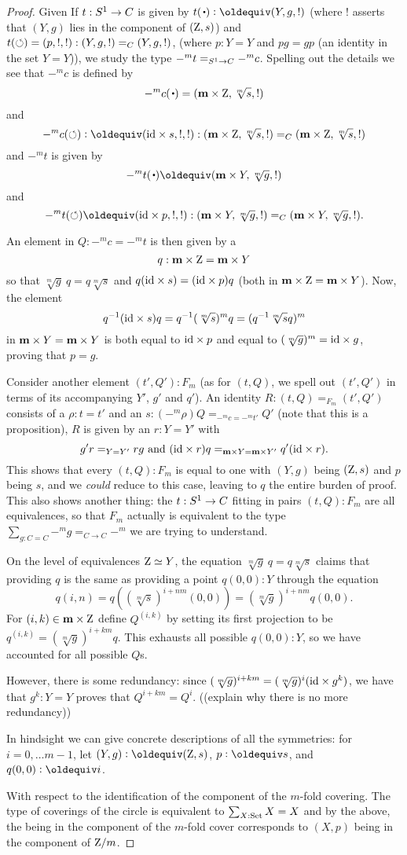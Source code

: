 \begin{proof}
Given If $t:{S^1}\to C$ is given by $t(\base)\defequi (Y,g,!)$ (where $!$ asserts that $(Y,g)$ lies in the component of $(\mathrm{Z},s)$)  and $t(\circlearrowleft)=(p,!,!):(Y,g,!)=_C(Y,g,!)$, (where $p:Y=Y$ and $pg=gp$ (an identity in the set $Y=Y$)), we study the type $-^mt=_{{S^1}\to C}-^mc$.
Spelling out the details we see that $-^mc$ is defined by 
$$-^mc(\base)=(\bn m\times\zet,\sqrt[m]s,!)$$ and 
$$-^mc(\Sloop)\defequi(\id\times s,!,!):(\bn m\times\zet,\sqrt[m]s,!)=_C(\bn m\times\zet,\sqrt[m]s,!)$$   and $-^mt$ is given by $$-^mt(\base)\oldequiv(\bn m\times Y,\sqrt[m]g,!)$$ and 
$$-^mt(\Sloop)\oldequiv(\id\times p,!,!):(\bn m\times Y,\sqrt[m]g,!)=_C(\bn m\times Y,\sqrt[m]g,!).$$

An element in $Q:-^mc=-^mt$ is then given by a 
$$q:\mathbf{m}\times\mathrm{Z}=\mathbf{m}\times Y$$ so that $\sqrt[m]g\ q=q\sqrt[m]s$ and $q(\mathord{\mathrm{id}}\times s)=(\mathord{\mathrm{id}}\times p)q$ (both in $\mathbf{m}\times\mathrm{Z}=\mathbf{m}\times Y$). 
Now, the element $$q^{-1}(\mathord{\mathrm{id}}\times s)q=q^{-1}(\sqrt[m]s)^mq=(q^{-1}\sqrt[m]sq)^m$$ in $\mathbf{m}\times Y=\mathbf{m}\times Y$ is both equal to $\mathord{\mathrm{id}}\times p$ and equal to $(\sqrt[m]g)^m=\mathord{\mathrm{id}}\times g$, proving that $p=g$. 


Consider another element $(t',Q'):F_m$ (as for $(t,Q)$, we spell out $(t',Q')$ in terms of its accompanying $Y'$, $g'$ and $q'$). 
An identity  $R:(t,Q)=_{F_m}(t',Q')$ consists of a $\rho:t=t'$ and an $s:(-^m\rho)Q=_{-^mc=-^mt'}Q'$ (note that this is a proposition), \ie $R$ is given by an $r:Y=Y'$ with 
$$g'r=_{Y=Y'}rg\text{ and }(\mathord{\mathrm{id}}\times r)q=_{\mathbf{m}\times Y=\mathbf{m}\times Y'}q'(\mathord{\mathrm{id}}\times r).$$  This shows that every $(t,Q):F_m$ is equal to one with $(Y,g)$ being $(\mathrm{Z},s)$ and $p$ being $s$, and we \emph{could} reduce to this case, leaving to $q$ the entire burden of proof.  
This also shows another thing: the $t:{S^1}\to C$ fitting in pairs $(t,Q):F_m$ are all equivalences, so that $F_m$ actually is equivalent to the type $\sum_{g:C=C}-^mg=_{C\to C}-^m$ we are trying to understand.

 On the level of equivalences $\mathrm{Z}\simeq Y$, the equation  $\sqrt[m]g\ q=q\sqrt[m]s$ claims that providing $q$ is the same as providing a point $q(0,0):Y$ through the equation  
$$q(i,n)=q((\sqrt[m]s)^{i+nm}(0,0))=(\sqrt[m]g)^{i+nm}q(0,0).$$  For $(i,k)\in \mathbf{m}\times\mathrm{Z}$ define $Q^{(i,k)}$ by setting its first projection to be $q^{(i,k)}=(\sqrt[m]g)^{i+km}q$.  
This exhausts all possible $q(0,0):Y$, so we have accounted for all possible $Q$s.

However, there is some redundancy: since $(\sqrt[m]g)^{i+km}=(\sqrt[m]g)^i(\mathord{\mathrm{id}}\times g^k)$, we have that $g^k:Y=Y$ proves that $Q^{i+km}=Q^{i}$.  ((explain why there is no more redundancy)) 

In hindsight we can give concrete descriptions of all the symmetries: for $i=0,\dots m-1$, let $(Y,g)\defequi (\zet,s)$, $p\defequi s$, and $q(0,0)\defequi i$.

With respect to the identification of the component of the $m$-fold covering.  The type of coverings of the circle is equivalent to $\sum_{X:\mathord{\mathrm{Set}}}X=X$ and by the above, the \covering being in the component of the $m$-fold cover corresponds to $(X,p)$ being in the component of $\mathrm{Z}/m$.
  \end{proof}

